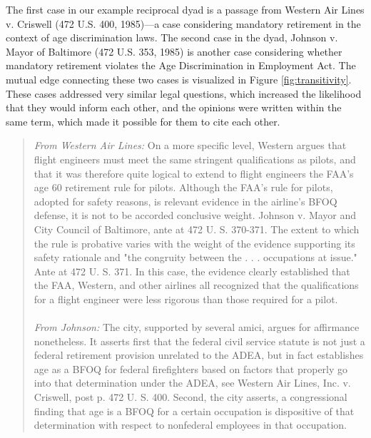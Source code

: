 \documentclass{cup-pan}
\begin{document}

The first case in our example reciprocal dyad is a passage from Western Air Lines v. Criswell (472 U.S. 400, 1985)---a case considering mandatory retirement in the context of age discrimination laws. The second case in the dyad, Johnson v. Mayor of Baltimore (472 U.S. 353, 1985) is another case considering whether mandatory retirement violates the Age Discrimination in Employment Act. The mutual edge connecting these two cases is visualized in Figure \ref{fig:transitivity}. These cases addressed very similar legal questions, which increased the likelihood that they would inform each other, and the opinions were written within the same term, which made it possible for them to cite each other. 
\begin{quotation}
{\em From Western Air Lines:} On a more specific level, Western argues that flight engineers must meet the same stringent qualifications as pilots, and that it was therefore quite logical to extend to flight engineers the FAA's age 60 retirement rule for pilots. Although the FAA's rule for pilots, adopted for safety reasons, is relevant evidence in the airline's BFOQ defense, it is not to be accorded conclusive weight. Johnson v. Mayor and City Council of Baltimore, ante at 472 U. S. 370-371. The extent to which the rule is probative varies with the weight of the evidence supporting its safety rationale and "the congruity between the . . . occupations at issue." Ante at 472 U. S. 371. In this case, the evidence clearly established that the FAA, Western, and other airlines all recognized that the qualifications for a flight engineer were less rigorous than those required for a pilot.
\\~\\
{\em From Johnson:} The city, supported by several amici, argues for affirmance nonetheless. It asserts first that the federal civil service statute is not just a federal retirement provision unrelated to the ADEA, but in fact establishes age as a BFOQ for federal firefighters based on factors that properly go into that determination under the ADEA, see Western Air Lines, Inc. v. Criswell, post p. 472 U. S. 400. Second, the city asserts, a congressional finding that age is a BFOQ for a certain occupation is dispositive of that determination with respect to nonfederal employees in that occupation. 
\end{quotation} %
\end{document}
